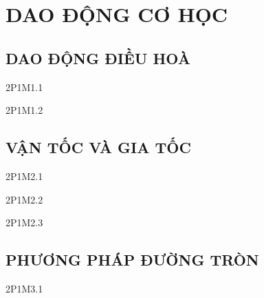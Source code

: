 \documentclass[
tuychon=HS1,
pagesize=BookA4,%
company=MAP, %
mausac = 01,
]{Class/MAPClass}
\begin{document}

%
\setcounter{chapter}{0}
\chapter{DAO ĐỘNG CƠ HỌC}
%
\section{DAO ĐỘNG ĐIỀU HOÀ}

%
\begin{cauhoiTN}{2P1M1.1} 

\end{cauhoiTN}
%

\setcounter{vidu}{0}
 
\Btvandung
\begin{cauhoiTN}{2P1M1.2}

\end{cauhoiTN}

\clearpage
\setcounter{section}{1}
\section{VẬN TỐC VÀ GIA TỐC}


\begin{cauhoiTN}{2P1M2.1}

\end{cauhoiTN}

\setcounter{vidu}{0}

\Btvandung
\begin{cauhoiTN}{2P1M2.2}

\end{cauhoiTN} 
%

\setcounter{vidu}{0}

\Btvandung
\begin{cauhoiTN}{2P1M2.3}

\end{cauhoiTN} 
%
\newpage

\section{PHƯƠNG PHÁP ĐƯỜNG TRÒN}


\setcounter{vidu}{0}

\Btvandung
\begin{cauhoiTN}{2P1M3.1}

\end{cauhoiTN}
%
\end{document}
